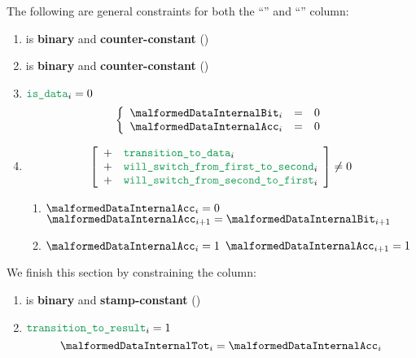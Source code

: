 The following are general constraints for both the ``'' and ``'' column:
\begin{enumerate}
    \item \malformedDataInternalBit{} is \textbf{binary} and \textbf{counter-constant} \quad (\trash)
    \item \malformedDataInternalAcc{} is \textbf{binary} and \textbf{counter-constant} \quad (\trash)
    \item \If $\locIsData _{i} = 0$ \Then
        \[
            \left\{ \begin{array}{lclr}
                \malformedDataInternalBit _{i} & = & 0 \\
                \malformedDataInternalAcc _{i} & = & 0 \\
            \end{array} \right.
        \]
    \item \If
        \[
            \left[ \begin{array}{cl}
                + & \locTransitionToData            _{i} \\
                + & \locWillSwitchFromFirstToSecond _{i} \\
                + & \locWillSwitchFromSecondToFirst _{i} \\
            \end{array} \right]
            \neq 0
        \]
        \Then
        \begin{enumerate}
            \item \If $\malformedDataInternalAcc _{i} = 0$ \Then $\malformedDataInternalAcc _{i+1} = \malformedDataInternalBit_ {i+1}$
            \item \If $\malformedDataInternalAcc _{i} = 1$ \Then $\malformedDataInternalAcc _{i+1} = 1$
        \end{enumerate}
\end{enumerate}
We finish this section by constraining the \malformedDataInternalTot{} column:
\begin{enumerate}[resume]
    \item \malformedDataInternalTot{} is \textbf{binary} and \textbf{stamp-constant} \quad (\trash)
    \item \If $\locTransitionToResult _{i} = 1$ \Then
        \[
            \malformedDataInternalTot _{i} = \malformedDataInternalAcc _{i}
        \]
\end{enumerate}
